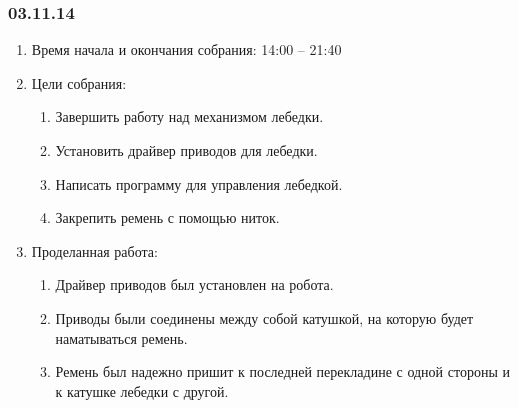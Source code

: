 	
\subsubsection{03.11.14}

\begin{enumerate}
	\item Время начала и окончания собрания:
	14:00 – 21:40
	\item Цели собрания:
	\begin{enumerate}
	  \item	Завершить работу над механизмом лебедки.
	  
	  \item	Установить драйвер приводов для лебедки.
	  
	  \item	Написать программу для управления лебедкой.
	  
	  \item	Закрепить ремень с помощью ниток.
	  
    \end{enumerate}
    
	\item Проделанная работа:
	\begin{enumerate}
	  \item	Драйвер приводов был установлен на робота.
      
      \item	Приводы были соединены между собой катушкой, на которую будет наматываться ремень.
      
      \item	Ремень был надежно пришит к последней перекладине с одной стороны и к катушке лебедки с другой.
      

\end{enumerate}
\end{enumerate}
